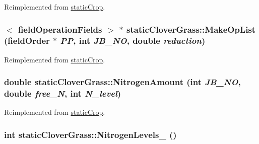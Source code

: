 Reimplemented from \hyperlink{classstatic_crop_afe0cb8a7831afa941a37338f05227d67}{staticCrop}.\hypertarget{classstatic_clover_grass_a109415e46a73076fa9b573f273aab284}{
\subsubsection[{MakeOpList}]{$<$ {\bf fieldOperationFields} $>$ $\ast$ staticCloverGrass::MakeOpList ({\bf fieldOrder} $\ast$ {\em PP}, \/  int {\em JB\_\-NO}, \/  double {\em reduction})}}
\label{classstatic_clover_grass_a109415e46a73076fa9b573f273aab284}


Reimplemented from \hyperlink{classstatic_crop_a9b67ef1ae531a3afb32b63a4aeb5916b}{staticCrop}.\hypertarget{classstatic_clover_grass_a751ba37577ff9a5fe44fb4cd0c3b62f2}{
\subsubsection[{NitrogenAmount}]{\setlength{\rightskip}{0pt plus 5cm}double staticCloverGrass::NitrogenAmount (int {\em JB\_\-NO}, \/  double {\em free\_\-N}, \/  int {\em N\_\-level})}}
\label{classstatic_clover_grass_a751ba37577ff9a5fe44fb4cd0c3b62f2}


Reimplemented from \hyperlink{classstatic_crop_af3aa85321a8a75406f8a0751b71587d0}{staticCrop}.\hypertarget{classstatic_clover_grass_a847d7d5346d43b21712110c1f73f5b4d}{
\subsubsection[{NitrogenLevels\_\-}]{\setlength{\rightskip}{0pt plus 5cm}int staticCloverGrass::NitrogenLevels\_\- ()}}
\label{classstatic_clover_grass_a847d7d5346d43b21712110c1f73f5b4d}


